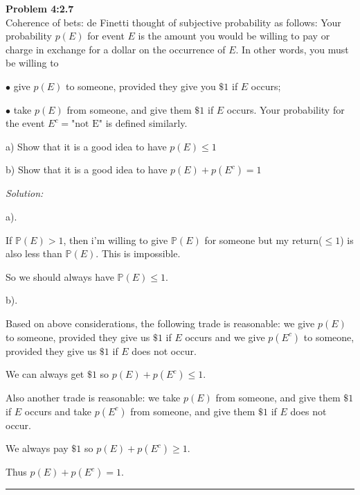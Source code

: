 \documentclass[a4paper, 11pt]{article}
\renewcommand{\P}{\mathbb{P}}
\newenvironment{problem}[2][Problem]
    { \begin{mdframed}[backgroundcolor=gray!20] \textbf{#1 #2} \\}
    {  \end{mdframed}}
\newenvironment{solution}
    {\textit{Solution:}}
    {}
\begin{document}
\begin{problem}{4:2.7}
Coherence of bets: de Finetti thought of subjective probability as follows:
Your probability $p(E)$ for event $E$ is the amount you would be willing to pay or charge in exchange for a dollar on the occurrence of $E .$ In other words, you must be willing to

$\bullet$ give $p(E)$ to someone, provided they give you $\$ 1$ if $E$ occurs;

$\bullet$ take $p(E)$ from someone, and give them $\$ 1$ if $E$ occurs. Your probability for the event $E^{c}=\text{"not E"}$ is defined similarly.

a) Show that it is a good idea to have $p(E) \leq 1$

b) Show that it is a good idea to have $p(E)+p\left(E^{c}\right)=1$
\end{problem}
\begin{solution}

a).

If $\P(E)>1$, then i'm willing to give $\P(E)$ for someone but my return($\leq 1$) is also less than $\P(E)$. This is impossible.

So we should always have $\P(E)\leq1$.

b).

Based on above considerations,  the following trade is reasonable: we give $p(E)$ to someone, provided they give us $\$ 1$ if $E$ occurs and we give $p(E^c)$ to someone, provided they give us $\$ 1$ if $E$ does not occur.

We can always get $\$ 1$ so $p(E)+p\left(E^{c}\right)\leq1$.

Also another trade is reasonable: we take $p(E)$ from someone, and give them $\$ 1$ if $E$ occurs and take $p(E^c)$ from someone, and give them $\$ 1$ if $E$ does not occur.

We always pay $\$ 1$ so $p(E)+p\left(E^{c}\right)\geq1$.

Thus $p(E)+p\left(E^{c}\right)=1$.

\end{solution} 
\noindent\rule{7in}{2.8pt}
\end{document}
